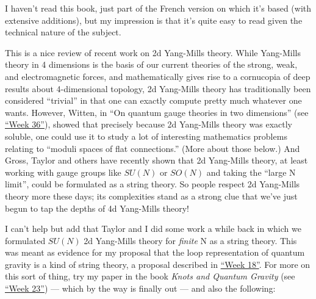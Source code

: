 \documentclass{article}
\def\tightlist{}
\renewcommand{\texttt}[1]{%
  \begingroup
  \ttfamily
  \begingroup\lccode`~=`/\lowercase{\endgroup\def~}{/\discretionary{}{}{}}%
  \begingroup\lccode`~=`[\lowercase{\endgroup\def~}{[\discretionary{}{}{}}%
  \begingroup\lccode`~=`.\lowercase{\endgroup\def~}{.\discretionary{}{}{}}%
  \catcode`/=\active\catcode`[=\active\catcode`.=\active
  \scantokens{#1\noexpand}%
  \endgroup
}
\begin{document}
I haven't read this book, just part of the French version on which it's
based (with extensive additions), but my impression is that it's quite
easy to read given the technical nature of the subject.


This is a nice review of recent work on 2d Yang-Mills theory. While
Yang-Mills theory in 4 dimensions is the basis of our current theories
of the strong, weak, and electromagnetic forces, and mathematically
gives rise to a cornucopia of deep results about 4-dimensional topology,
2d Yang-Mills theory has traditionally been considered ``trivial'' in
that one can exactly compute pretty much whatever one wants. However,
Witten, in ``On quantum gauge theories in two dimensions'' (see
\protect\hyperlink{week36}{``Week 36''}), showed that precisely because
2d Yang-Mills theory was exactly soluble, one could use it to study a
lot of interesting mathematics problems relating to ``moduli spaces of
flat connections.'' (More about those below.) And Gross, Taylor and
others have recently shown that 2d Yang-Mills theory, at least working
with gauge groups like \(SU(N)\) or \(SO(N)\) and taking the ``large N
limit'', could be formulated as a string theory. So people respect 2d
Yang-Mills theory more these days; its complexities stand as a strong
clue that we've just begun to tap the depths of 4d Yang-Mills theory!

I can't help but add that Taylor and I did some work a while back in
which we formulated \(SU(N)\) 2d Yang-Mills theory for \emph{finite} N
as a string theory. This was meant as evidence for my proposal that the
loop representation of quantum gravity is a kind of string theory, a
proposal described in \protect\hyperlink{week18}{``Week 18''}. For more
on this sort of thing, try my paper in the book \emph{Knots and Quantum
Gravity} (see \protect\hyperlink{week23}{``Week 23''}) --- which by the
way is finally out --- and also the following:

\end{document}
